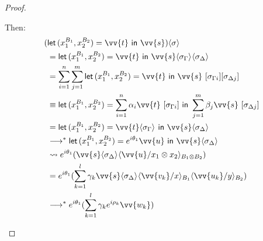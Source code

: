 \documentclass[runningheads,orivec,envcountsame,envcountsect]{llncs}
\newcommand\lra{\longrightarrow}
\newcommand\ansubst[2]{\ensuremath{\langle #1 \rangle_{#2}}}
\def\Pair#1#2{(#1,#2)} %
\def\letkeyword{\mathsf{let}}
\def\inkeyword{\mathsf{in}}
\def\LetP#1#2#3#4#5#6{\letkeyword\,\Pair{#1^{#2}}{#3^{#4}}=#5~\inkeyword~#6}
\def\lraneq{\rightsquigarrow}
\def\eval{\lra^*}
\begin{document}
\begin{proof}
\begin{description}
    Then:
    \begin{align*}
        (&\LetP{x_1}{B_1}{x_2}{B_2}{\vv{t}}{\vv{s}})\ansubst{\sigma}{} \\
        &= \LetP{x_1}{B_1}{x_2}{B_2}{\vv{t}}{\vv{s}}\ansubst{\sigma_\Gamma}{}\ansubst{\sigma_\Delta}{}\\
        &=\sum_{i=1}^{n}\sum_{j=1}^{m}\LetP{x_1}{B_1}{x_2}{B_2}{\vv{t}}{\vv{s}}\ [\sigma_{\Gamma i}][\sigma_{\Delta j}]\\
        &\equiv \LetP{x_1}{B_1}{x_2}{B_2}{\sum_{i=1}^{n}\alpha_i\vv{t}\ [\sigma_{\Gamma i}]}{\sum_{j=1}^{m}\beta_j \vv{s}\ [\sigma_{\Delta j}]}\\
        &=\LetP{x_1}{B_1}{x_2}{B_2}{\vv{t}\ansubst{\sigma_\Gamma}{}}{\vv{s}\ansubst{\sigma_\Delta}{}}\\
        &\eval\LetP{x_1}{B_1}{x_2}{B_2}{e^{i\theta_1}\vv{u}}{\vv{s}\ansubst{\sigma_\Delta}{}}\\
        &\lraneq e^{i\theta_1}(\vv{s}\ansubst{\sigma_\Delta}{}\ansubst{\vv{u}/x_1\otimes x_2}{B_1\otimes B_2})\\
        &=e^{i\theta_1} (\sum_{k=1}^{l}\gamma_k\vv{s}\ansubst{\sigma_\Delta}{}\ansubst{\vv{v_k}/x}{B_1}\ansubst{\vv{u_k}/y}{B_2})\\
        &\eval e^{i\theta_1} (\sum_{k=1}^{l}\gamma_k e^{i\rho_k} \vv{w_k})\\
    \end{align*}


\end{description}
\end{proof}
\end{document}
